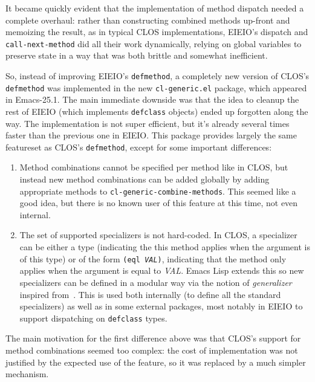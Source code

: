 \documentclass[format=acmsmall, review]{acmart}
\newcommand \Elisp {Emacs Lisp}
\newcommand \id[1] {\textrm{\textsl{#1}}}
\begin{document}
It became quickly evident that the implementation of method dispatch
needed a complete overhaul: rather than constructing combined methods
up-front and memoizing the result, as in typical CLOS implementations,
EIEIO's dispatch and \texttt{call-next-method} did all their work
dynamically, relying on global variables to preserve state in
a way that was both brittle and somewhat inefficient.

So, instead of improving EIEIO's \texttt{defmethod}, a completely new
version of CLOS's \texttt{defmethod} was implemented in the new
\texttt{cl-generic.el} package, which appeared in Emacs-25.1.  The main
immediate downside was that the idea to cleanup the rest of EIEIO (which
implements \texttt{defclass} objects) ended up forgotten along the way.
The implementation is not super efficient, but it's already several times
faster than the previous one in EIEIO.  This package provides largely the
same featureset as CLOS's \texttt{defmethod}, except for some important
differences:
\begin{enumerate}
\item Method combinations cannot be specified per method like in CLOS, but
  instead new method combinations can be added globally by adding
  appropriate methods to
  \texttt{cl-\linebreak[0]generic-\linebreak[0]combine-\linebreak[0]methods}.
  This seemed like a good idea, but there is no known user of this feature
  at this time, not even internal.
\item The set of supported specializers is not hard-coded.  In CLOS,
  a specializer can be either a type (indicating the this method applies when the argument is of
  this type) or of the form \texttt{(eql \id{VAL})}, indicating that the
  method only applies when the argument is equal to \id{VAL}.
  \Elisp{} extends this so new specializers
  can be defined in a modular way via the notion of \emph{generalizer}
  inspired from~\citet{Rhodes14}.  This is used both internally (to define
  all the standard specializers) as well as in some external packages, most
  notably in EIEIO to support dispatching on \texttt{defclass} types.
\end{enumerate}
The main motivation for the first difference above was that CLOS's support
for method combinations seemed too complex: the cost of implementation was
not justified by the expected use of the feature, so it was replaced by
a much simpler mechanism.
\end{document}
